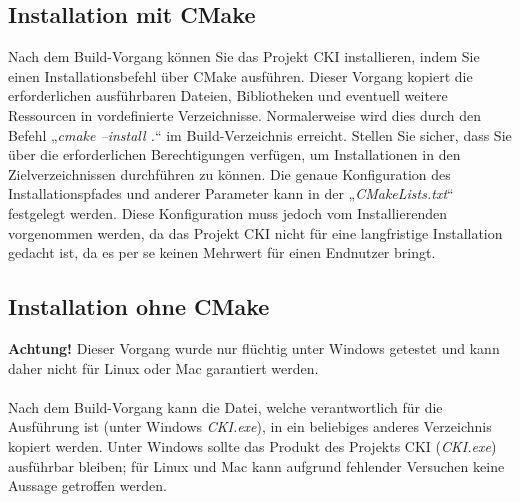 \subsection{Installation mit CMake}
\label{sec:InstallInstallationMitCMake}
Nach dem Build-Vorgang können Sie das Projekt CKI installieren, indem Sie einen Installationsbefehl über CMake ausführen. Dieser Vorgang kopiert die erforderlichen ausführbaren Dateien, Bibliotheken und eventuell weitere Ressourcen in vordefinierte Verzeichnisse. Normalerweise wird dies durch den Befehl „\textit{cmake --install .}“ im Build-Verzeichnis erreicht. Stellen Sie sicher, dass Sie über die erforderlichen Berechtigungen verfügen, um Installationen in den Zielverzeichnissen durchführen zu können. Die genaue Konfiguration des Installationspfades und anderer Parameter kann in der „\textit{CMakeLists.txt}“ festgelegt werden. Diese Konfiguration muss jedoch vom Installierenden vorgenommen werden, da das Projekt CKI nicht für eine langfristige Installation gedacht ist, da es per se keinen Mehrwert für einen Endnutzer bringt.

\subsection{Installation ohne CMake}
\label{sec:IsntallInstallationOhneCMake}
\textbf{Achtung!} Dieser Vorgang wurde nur flüchtig unter Windows getestet und kann daher nicht für Linux oder Mac garantiert werden.
\\
\\
Nach dem Build-Vorgang kann die Datei, welche verantwortlich für die Ausführung ist (unter Windows \textit{CKI.exe}), in ein beliebiges anderes Verzeichnis kopiert werden. Unter Windows sollte das Produkt des Projekts CKI (\textit{CKI.exe}) ausführbar bleiben; für Linux und Mac kann aufgrund fehlender Versuchen keine Aussage getroffen werden. 

